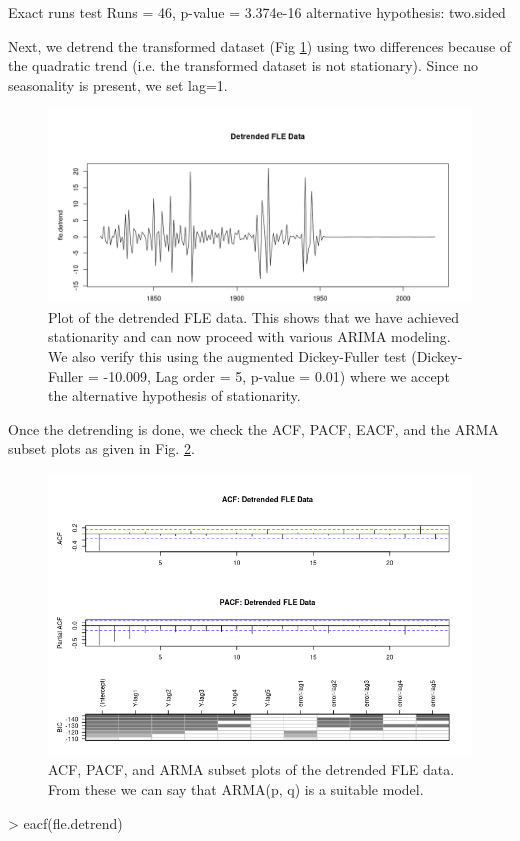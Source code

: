 \begin{enumerate}[label=(\alph*)]
\begin{block}
Exact runs test
Runs = 46, p-value = 3.374e-16
alternative hypothesis: two.sided
\end{block}
\normalsize Next, we detrend the transformed dataset (Fig \ref{fig:detrend_fle}) using two differences because of the quadratic trend (i.e. the transformed dataset is not stationary). Since no seasonality is present, we set lag=1.
\begin{figure}[!htb]
    \centering
    \includegraphics[width=\linewidth]{Images/P4/Detrend_FLE.png}
    \caption[Plot of the detrended FLE data.]{Plot of the detrended FLE data. This shows that we have achieved stationarity and can now proceed with various ARIMA modeling. We also verify this using the augmented Dickey-Fuller test (Dickey-Fuller = -10.009, Lag order = 5, p-value = 0.01) where we accept the alternative hypothesis of stationarity.}
    \label{fig:detrend_fle}
\end{figure}
Once the detrending is done, we check the ACF, PACF, EACF, and the ARMA subset plots as given in Fig. \ref{fig:acf_fle}.

\begin{figure}[!htb]
    \centering
    \includegraphics[width=\linewidth]{Images/P4/ACF_Plots_FLE.png}
    \caption[ACF, PACF, and ARMA subset plots of the detrended FLE data]{ACF, PACF, and ARMA subset plots of the detrended FLE data. From these we can say that ARMA(p, q) is a suitable model.}
    \label{fig:acf_fle}
\end{figure}
\small\begin{block}
> eacf(fle.detrend)


\end{block}
\end{enumerate}
